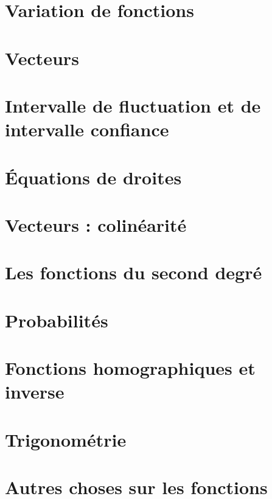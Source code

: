 \documentclass[a4paper,10pt]{book}
\begin{document}
\chapter{Variation de fonctions}

\chapter{Vecteurs}


\chapter{Intervalle de fluctuation et de intervalle confiance}


\chapter{Équations de droites}


\chapter{Vecteurs : colinéarité}


\chapter{Les fonctions du second degré}


\chapter{Probabilités}


\chapter{Fonctions homographiques et inverse}


\chapter{Trigonométrie}



\chapter{Autres choses sur les fonctions}

\end{document}
